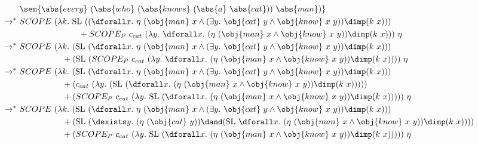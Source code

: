 \begin{align*}
  & \sem{\abs{every}\ (\abs{who}\ (\abs{knows}\ (\abs{a}\ \abs{cat}))\ \abs{man})} \\
\rightarrow^*\ & SCOPE\ (\lambda k.\ \mathrm{SL}\ ((\dforall x.\
  \eta\ (\obj{man}\ x \land (\exists y.\ \obj{cat}\ y \land
  \obj{know}\ x\ y)) \dimp (k\ x))) \\
  & \hspace{25mm} + SCOPE_P\ c_{cat}\ (\lambda y.\ \dforall x.\ (\eta\ (\obj{man}\ x
  \land \obj{know}\ x\ y)) \dimp (k\ x)))\ \eta \\
\rightarrow^*\ & SCOPE\ (\lambda k.\ (\mathrm{SL}\ (\dforall x.\
  \eta\ (\obj{man}\ x \land (\exists y.\ \obj{cat}\ y \land
  \obj{know}\ x\ y)) \dimp (k\ x))) \\
  & \hspace{18mm} + (\mathrm{SL}\ (SCOPE_P\ c_{cat}\ (\lambda y.\ \dforall
  x.\ (\eta\ (\obj{man}\ x \land \obj{know}\ x\ y)) \dimp (k\ x))))\ \eta \\
\rightarrow^*\ & SCOPE\ (\lambda k.\ (\mathrm{SL}\ (\dforall x.\
  \eta\ (\obj{man}\ x \land (\exists y.\ \obj{cat}\ y \land
  \obj{know}\ x\ y)) \dimp (k\ x))) \\
  & \hspace{18mm} + (c_{cat}\ (\lambda y.\ (\mathrm{SL}\ (\dforall
  x.\ (\eta\ (\obj{man}\ x \land \obj{know}\ x\ y)) \dimp (k\ x))))) \\
  & \hspace{18mm} + (SCOPE_P\ c_{cat}\ (\lambda y.\ \mathrm{SL}\ (\dforall
  x.\ (\eta\ (\obj{man}\ x \land \obj{know}\ x\ y)) \dimp (k\ x)))))\ \eta \\
\rightarrow^*\ & SCOPE\ (\lambda k.\ (\mathrm{SL}\ (\dforall x.\
  \eta\ (\obj{man}\ x \land (\exists y.\ \obj{cat}\ y \land
  \obj{know}\ x\ y)) \dimp (k\ x))) \\
  & \hspace{18mm} + (\mathrm{SL}\ (\dexists y.\ (\eta\ (\obj{cat}\ y)) \dand (\mathrm{SL}\ \dforall
  x.\ (\eta\ (\obj{man}\ x \land \obj{know}\ x\ y)) \dimp (k\ x)))) \\
  & \hspace{18mm} + (SCOPE_P\ c_{cat}\ (\lambda y.\ \mathrm{SL}\ (\dforall
  x.\ (\eta\ (\obj{man}\ x \land \obj{know}\ x\ y)) \dimp (k\ x)))))\ \eta \\
\end{align*}

